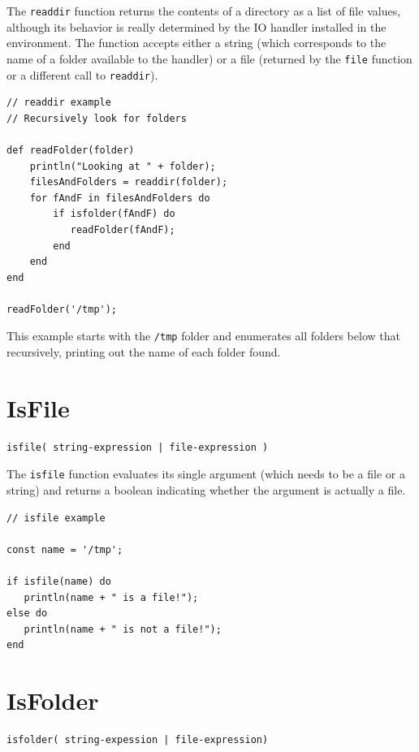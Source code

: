 The \verb+readdir+ function returns the contents of a directory as a list of file values, although its behavior is really determined by the IO handler installed in the \Reflex environment. The function accepts either a string (which corresponds to the name of a folder available to the handler) or a file (returned by the \verb+file+ function or a different call to \verb+readdir+).

\begin{lstlisting}[caption={readdir example}]
// readdir example
// Recursively look for folders

def readFolder(folder)
    println("Looking at " + folder);
    filesAndFolders = readdir(folder);
    for fAndF in filesAndFolders do
        if isfolder(fAndF) do
           readFolder(fAndF);
        end
    end
end

readFolder('/tmp');

\end{lstlisting}

This example starts with the \verb+/tmp+ folder and enumerates all folders below that recursively, printing out the name of each folder found.

\section{IsFile}

\begin{verbatim}
isfile( string-expression | file-expression )
\end{verbatim}

The \verb+isfile+ function evaluates its single argument (which needs to be a file or a string) and returns a boolean indicating whether the argument is actually a file.

\begin{lstlisting}[caption={IsFile example}]
// isfile example

const name = '/tmp';

if isfile(name) do
   println(name + " is a file!");
else do
   println(name + " is not a file!");
end

\end{lstlisting}

\section{IsFolder}

\begin{verbatim}
isfolder( string-expession | file-expression)
\end{verbatim}

